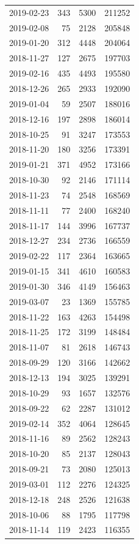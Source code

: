 \begin{tabular}{lrrr}
2019-02-23 & 343 & 5300 & 211252 \\
2019-02-08 & 75 & 2128 & 205848 \\
2019-01-20 & 312 & 4448 & 204064 \\
2018-11-27 & 127 & 2675 & 197703 \\
2019-02-16 & 435 & 4493 & 195580 \\
2018-12-26 & 265 & 2933 & 192090 \\
2019-01-04 & 59 & 2507 & 188016 \\
2018-12-16 & 197 & 2898 & 186014 \\
2018-10-25 & 91 & 3247 & 173553 \\
2018-11-20 & 180 & 3256 & 173391 \\
2019-01-21 & 371 & 4952 & 173166 \\
2018-10-30 & 92 & 2146 & 171114 \\
2018-11-23 & 74 & 2548 & 168569 \\
2018-11-11 & 77 & 2400 & 168240 \\
2018-11-17 & 144 & 3996 & 167737 \\
2018-12-27 & 234 & 2736 & 166559 \\
2019-02-22 & 117 & 2364 & 163665 \\
2019-01-15 & 341 & 4610 & 160583 \\
2019-01-30 & 346 & 4149 & 156463 \\
2019-03-07 & 23 & 1369 & 155785 \\
2018-11-22 & 163 & 4263 & 154498 \\
2018-11-25 & 172 & 3199 & 148484 \\
2018-11-07 & 81 & 2618 & 146743 \\
2018-09-29 & 120 & 3166 & 142662 \\
2018-12-13 & 194 & 3025 & 139291 \\
2018-10-29 & 93 & 1657 & 132576 \\
2018-09-22 & 62 & 2287 & 131012 \\
2019-02-14 & 352 & 4064 & 128645 \\
2018-11-16 & 89 & 2562 & 128243 \\
2018-10-20 & 85 & 2137 & 128043 \\
2018-09-21 & 73 & 2080 & 125013 \\
2019-03-01 & 112 & 2276 & 124325 \\
2018-12-18 & 248 & 2526 & 121638 \\
2018-10-06 & 88 & 1795 & 117798 \\
2018-11-14 & 119 & 2423 & 116355 \\

\end{tabular}
